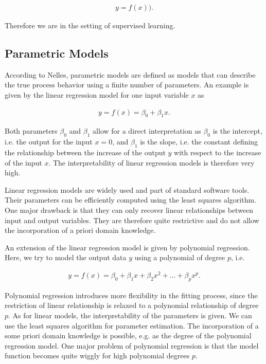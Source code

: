 \documentclass[10pt,a4paper]{article}
\begin{document}
\begin{align} \label{eq:basic-model-structure}
	y = f(x)).
\end{align}

Therefore we are in the setting of supervised learning. 

\subsection{Parametric Models}

According to Nelles, parametric models are defined as models that can describe the true process behavior using a finite number of parameters.\cite{nelles2013nonlinear} An example is given by the linear regression model for one input variable $x$ as

\begin{align} \label{eq:classical-linear-model}
	y= f(x) = \beta_0 + \beta_1 x.
\end{align}

Both parameters $\beta_0$ and $\beta_1$ allow for a direct interpretation as $\beta_0$ is the intercept, i.e. the output for the input $x=0$, and $\beta_1$ is the slope, i.e. the constant defining the relationship between the increase of the output $y$ with respect to the increase of the input $x$.  The interpretability of linear regression models is therefore very high. 

Linear regression models are widely used and part of standard software tools. Their parameters can be efficiently computed using the least squares algorithm. One major drawback is that they can only recover linear relationships between input and output variables. They are therefore quite restrictive and do not allow the incorporation of a priori domain knowledge. 

An extension of the linear regression model is given by polynomial regression. Here, we try to model the output data $y$ using a polynomial of degree $p$, i.e.

\begin{align} \label{eq:polynomial-model}
	y = f(x) = \beta_0 + \beta_1 x + \beta_2 x^2 + \dots + \beta_p x^p.
\end{align}

Polynomial regression introduces more flexibility in the fitting process, since the restriction of linear relationship is relaxed to a polynomial relationship of degree $p$. As for linear models, the interpretability of the parameters is given. We can use the least squares algorithm for parameter estimation. The incorporation of a some priori domain knowledge is possible, e.g. as the degree of the polynomial regression model. One major problem of polynomial regression is that the model function becomes quite wiggly for high polynomial degrees $p$. 
\end{document}
